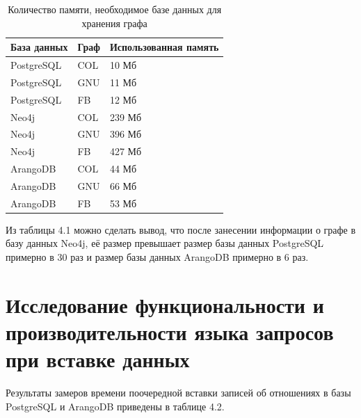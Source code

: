 \begin{table} [htbp]
    \centering\small
    \caption{Количество памяти, необходимое базе данных для хранения графа}
    \begin{tabular}{|l|l|p{3cm}|}
        \hline
        База данных & Граф & Использованная память \\ \hline
        PostgreSQL  & COL  & 10 Мб                 \\ \hline
        PostgreSQL  & GNU  & 11 Мб                 \\ \hline
        PostgreSQL  & FB   & 12 Мб                 \\ \hline
        Neo4j       & COL  & 239 Мб                \\ \hline
        Neo4j       & GNU  & 396 Мб                \\ \hline
        Neo4j       & FB   & 427 Мб                \\ \hline
        ArangoDB    & COL  & 44 Мб                 \\ \hline
        ArangoDB    & GNU  & 66 Мб                 \\ \hline
        ArangoDB    & FB   & 53 Мб                 \\ \hline
    \end{tabular}
    \normalsize
\end{table}

Из таблицы 4.1 можно сделать вывод, что после занесении информации о графе в базу данных Neo4j, её размер превышает размер базы данных
PostgreSQL примерно в 30 раз и размер базы данных ArangoDB примерно в 6 раз.


\section{Исследование функциональности и производительности языка запросов при вставке данных}

Результаты замеров времени поочередной вставки записей об отношениях в базы PostgreSQL и ArangoDB приведены в таблице 4.2.

